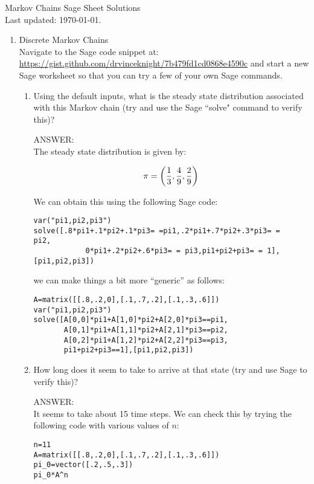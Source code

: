 \documentclass[12pt]{article}
\begin{document}
\begin{center}
\Huge{Markov Chains Sage Sheet Solutions}\\
\tiny{Last updated: \today.}
\end{center}

\begin{enumerate}
\item Discrete Markov Chains\\
Navigate to the Sage code snippet at: \url{https://gist.github.com/drvinceknight/7b479fd1cd0868e4590c} and start a new Sage worksheet so that you can try a few of your own Sage commands.

\begin{enumerate}
\item Using the default inputs, what is the steady state distribution associated with this Markov chain (try and use the Sage ``solve" command to verify this)?

ANSWER:\\
The steady state distribution is given by:

$$\pi=\left({1\over 3},{4\over 9},{2\over 9}\right)$$

We can obtain this using the following Sage code:

\begin{verbatim}
var("pi1,pi2,pi3")
solve([.8*pi1+.1*pi2+.1*pi3= =pi1,.2*pi1+.7*pi2+.3*pi3= =   pi2,
            0*pi1+.2*pi2+.6*pi3= = pi3,pi1+pi2+pi3= = 1],[pi1,pi2,pi3])
\end{verbatim}

we can make things a bit more ``generic'' as follows:
\begin{verbatim}
A=matrix([[.8,.2,0],[.1,.7,.2],[.1,.3,.6]])
var("pi1,pi2,pi3")
solve([A[0,0]*pi1+A[1,0]*pi2+A[2,0]*pi3==pi1,
       A[0,1]*pi1+A[1,1]*pi2+A[2,1]*pi3==pi2,
       A[0,2]*pi1+A[1,2]*pi2+A[2,2]*pi3==pi3,
       pi1+pi2+pi3==1],[pi1,pi2,pi3])
\end{verbatim}

\item How long does it seem to take to arrive at that state (try and use Sage to verify this)?

ANSWER:\\
It seems to take about 15 time steps. We can check this by trying the following code with various values of $n$:

\begin{verbatim}
n=11
A=matrix([[.8,.2,0],[.1,.7,.2],[.1,.3,.6]])
pi_0=vector([.2,.5,.3])
pi_0*A^n
\end{verbatim}


\end{enumerate}
\end{enumerate}
\end{document}

